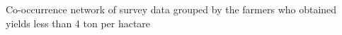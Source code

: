 Co-occurrence network of survey data grouped by the farmers who obtained yields less than 4 ton per hactare
